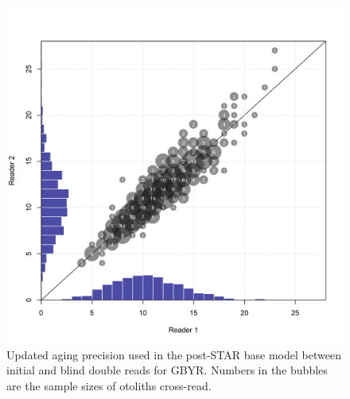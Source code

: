 \documentclass[12pt,]{article}
\begin{document}
\FloatBarrier

\begin{figure}
\centering
\includegraphics{Figures/GBY_age_error_updated.png}
\caption{Updated aging precision used in the post-STAR base model
between initial and blind double reads for GBYR. Numbers in the bubbles
are the sample sizes of otoliths cross-read.
\label{fig:GBY_age_error_updated}}
\end{figure}

\FloatBarrier
\end{document}
